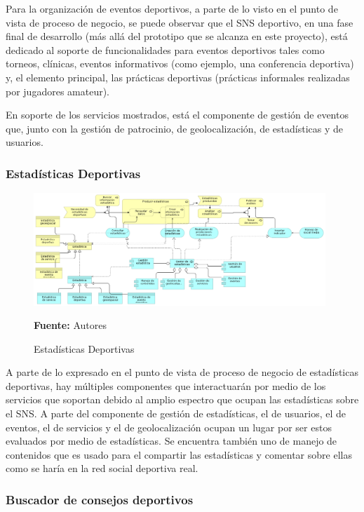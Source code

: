Para la organización de eventos deportivos, a parte de lo visto en el punto de vista de proceso de negocio, se puede observar que el SNS deportivo, en una fase final de desarrollo (más allá del prototipo que se alcanza en este proyecto), está dedicado al soporte de funcionalidades para eventos deportivos tales como torneos, clínicas, eventos informativos (como ejemplo, una conferencia deportiva) y, el elemento principal, las prácticas deportivas (prácticas informales realizadas por jugadores amateur).

En soporte de los servicios mostrados, está el componente de gestión de eventos que, junto con la gestión de patrocinio, de geolocalización, de estadísticas y de usuarios.

\subsubsection{Estadísticas Deportivas}

\begin{figure}[!htb]
  \begin{center}
    \includegraphics[width=11cm]{./imagenes/Archimate/vistas/application_usage/estadisticasdeportivas.png}
    \caption{Estadísticas Deportivas}
    \label{fig:au_estadisticas_deportivas}
    \textbf{Fuente:}  Autores
  \end{center}
\end{figure}

A parte de lo expresado en el punto de vista de proceso de negocio de estadísticas deportivas, hay múltiples componentes que interactuarán por medio de los servicios que soportan debido al amplio espectro que ocupan las estadísticas sobre el SNS. A parte del componente de gestión de estadísticas, el de usuarios, el de eventos, el de servicios y el de geolocalización ocupan un lugar por ser estos evaluados por medio de estadísticas. Se encuentra también uno de manejo de contenidos que es usado para el compartir las estadísticas y comentar sobre ellas como se haría en la red social deportiva real.

\subsubsection{Buscador de consejos deportivos}

